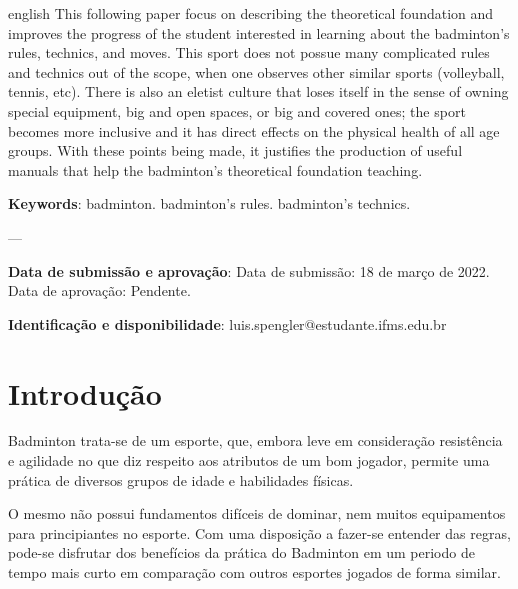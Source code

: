 \documentclass[
	article,			%
	11pt,				%
	oneside,			%
	a4paper,			%
	english,			%
	brazil,				%
	sumario=tradicional
	]{abntex2}
\begin{document}
\renewcommand{\resumoname}{Abstract}
\begin{resumoumacoluna}
 \begin{otherlanguage*}{english}
This following paper focus on describing the theoretical foundation and improves the progress
of the student interested in learning about the badminton's rules, technics, and moves.
This sport does not possue many complicated rules and technics out of the scope, when one
observes other similar sports (volleyball, tennis, etc). There is also an eletist culture
that loses itself in the sense of owning special equipment, big and open spaces, or big and covered ones;
the sport becomes more inclusive and it has direct effects on the physical health of all age groups.
With these points being made, it justifies the production of useful manuals that help the badminton's theoretical foundation
teaching.

   \vspace{\onelineskip}
 
   \noindent
   \textbf{Keywords}: badminton. badminton's rules. badminton's technics.
 \end{otherlanguage*}  
\end{resumoumacoluna}

---

\begin{center}\smaller
\textbf{Data de submissão e aprovação}: Data de submissão: 18 de março de 2022. Data de aprovação: Pendente.

\textbf{Identificação e disponibilidade}: luis.spengler@estudante.ifms.edu.br 
\end{center}

\textual

\section{Introdução}
Badminton trata-se de um esporte, que, embora leve em consideração resistência e agilidade no que diz respeito aos atributos de um bom jogador, permite uma prática de diversos grupos de idade e habilidades físicas.

O mesmo não possui fundamentos difíceis de dominar, nem muitos equipamentos para principiantes no esporte. Com uma disposição a fazer-se entender das regras, pode-se disfrutar dos benefícios da prática do Badminton em um periodo de tempo mais curto em comparação com outros esportes jogados de forma similar.
\end{document}

